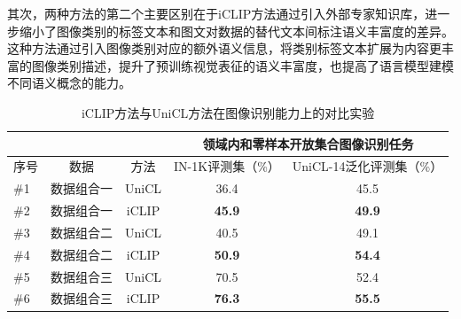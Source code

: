其次，两种方法的第二个主要区别在于iCLIP方法通过引入外部专家知识库，进一步缩小了图像类别的标签文本和图文对数据的替代文本间标注语义丰富度的差异。这种方法通过引入图像类别对应的额外语义信息，将类别标签文本扩展为内容更丰富的图像类别描述，提升了预训练视觉表征的语义丰富度，也提高了语言模型建模不同语义概念的能力。


\begin{table}
    \centering
    \caption{iCLIP方法与UniCL方法在图像识别能力上的对比实验}
    \begin{tabular}{lcccc}
    \toprule
        \multicolumn{1}{c}{} &
        \multicolumn{1}{c}{} & \multicolumn{1}{c}{} & \multicolumn{2}{c}{领域内和零样本开放集合图像识别任务} \\
        \midrule
        序号 & 数据 & 方法 & IN-1K评测集（\%） & UniCL-14泛化评测集（\%）   \\
        \midrule
        \#1 & 数据组合一 & UniCL & 36.4 & 45.5 \\  
        \#2 & 数据组合一 & iCLIP & \textbf{45.9} & \textbf{49.9} \\  

        \midrule
        
        \#3 & 数据组合二 & UniCL & 40.5 & 49.1 \\
        \#4 & 数据组合二 & iCLIP & \textbf{50.9} & \textbf{54.4} \\   

        \midrule
        
        \#5 & 数据组合三 & UniCL & 70.5  & 52.4 \\
        \#6 & 数据组合三 & iCLIP & \textbf{76.3} & \textbf{55.5} \\

        \bottomrule
    \end{tabular}
    \label{tab:iclip-tounicl}
\end{table}

